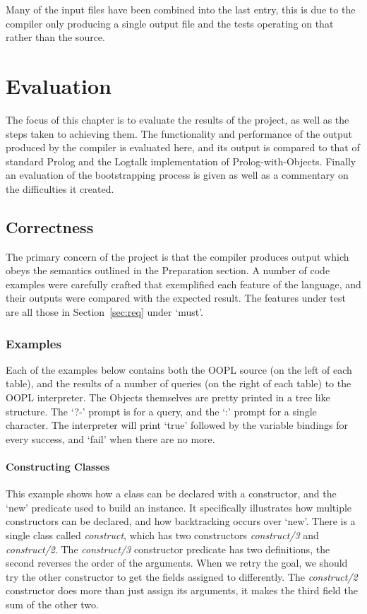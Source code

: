 \documentclass[12pt,a4paper,twoside,openright]{report}
\begin{document}
Many of the input files have been combined into the last entry, this is due to the compiler only producing a single output file and the tests operating on that rather than the source.

\chapter{Evaluation}

The focus of this chapter is to evaluate the results of the project, as well as the steps taken to achieving them. The functionality and performance of the output produced by the compiler is evaluated here, and its output is compared to that of standard Prolog and the Logtalk implementation of Prolog-with-Objects. Finally an evaluation of the bootstrapping process is given as well as a commentary on the difficulties it created.

\section{Correctness}

The primary concern of the project is that the compiler produces output which obeys the semantics outlined in the Preparation section. A number of code examples were carefully crafted that exemplified each feature of the language, and their outputs were compared with the expected result. The features under test are all those in Section~\ref{sec:req} under `must'.

\subsection{Examples}

Each of the examples below contains both the OOPL source (on the left of each table), and the results of a number of queries (on the right of each table) to the OOPL interpreter. The Objects themselves are pretty printed in a tree like structure. The `?-' prompt  is for a query, and the `\textbar:' prompt for a single character. The interpreter will print `true' followed by the variable bindings for every success, and `fail' when there are no more.

	\subsubsection{Constructing Classes}
This example shows how a class can be declared with a constructor, and the `new' predicate used to build an instance. It specifically illustrates how multiple constructors can be declared, and how backtracking occurs over `new'. There is a single class called \emph{construct}, which has two constructors \emph{construct/3} and  \emph{construct/2}.  The \emph{construct/3} constructor predicate has two definitions, the second reverses the order of the arguments. When we retry the goal, we should try the other constructor to get the fields assigned to differently. The  \emph{construct/2} constructor does more than just assign its arguments, it makes the third field the sum of the other two.
	
\end{document}
